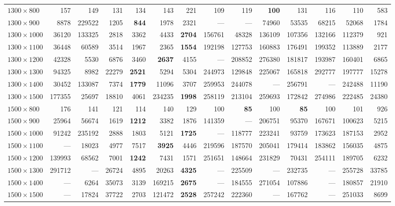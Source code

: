 \begin{table}[t!]
{\begin{tabular}{l r r r r r r r r r r r r r}
		$1300 \times 800$ & 157 & 149 & 131 & 134 & 143 & 221
		& 109 & 119 & \textbf{100} & 131 & 116 & 110 & 583 \\
		$1300 \times 900$ & 8878 & 229522 & 1205 & \textbf{844} & 1978 & 2321
		& --- & --- & 74960 & 53535 & 68215 & 52068 & 1784 \\
		$1300 \times 1000$ & 36120 & 133325 & 2818 & 3362 & 4433 & \textbf{2704}
		& 156761 & 48328 & 136109 & 107356 & 132166 & 112379 & 921 \\
		$1300 \times 1100$ & 36448 & 60589 & 3514 & 1967 & 2365 & \textbf{1554}
		& 192198 & 127753 & 160883 & 176491 & 199352 & 113889 & 2177 \\
		$1300 \times 1200$ & 42328 & 5530 & 6876 & 3460 & \textbf{2637} & 4155
		& --- & 208852 & 276380 & 181817 & 193987 & 160401 & 6865 \\
		$1300 \times 1300$ & 94325 & 8982 & 22279 & \textbf{2521} & 5294 & 5304
		& 244973 & 129848 & 225067 & 165818 & 292777 & 197777 & 15278 \\	
		$1300 \times 1400$ & 30452 & 133087 & 7374 & \textbf{1779} & 11096 & 3707
		& 259953 & 244078 & --- & 256791 & --- & 242488 & 11190 \\
		$1300 \times 1500$ & 177355 & 25697 & 18810 & 4061 & 234235 & \textbf{1998}
		& 258119 & 213104 & 259693 & 172842 & 274986 & 222485 & 24380 \\
		$1500 \times 800$ & 176 & 141 & 121 & 114 & 140 & 129
		& 100 & \textbf{85} & 100 & \textbf{85} & 100 & 101 & 926 \\ 
		$1500 \times 900$ & 25964 & 56674 & 1619 & \textbf{1212} & 3382 & 1876
		& 141359 & --- & 206751 & 95370 & 167671 & 100623 & 5215 \\ 
		$1500 \times 1000$ & 91242 & 235192 & 2888 & 1803 & 5121 & \textbf{1725}
		& --- & 118777 & 223241 & 93759 & 173623 & 187153 & 2952 \\
		$1500 \times 1100$ & --- & 18023 & 4977 & 7517 & \textbf{3925} & 4446
		& 219596 & 187570 & 205041 & 179414 & 183862 & 156035 & 4875 \\
		$1500 \times 1200$ & 139993 & 68562 & 7001 & \textbf{1242} & 7431 & 1571
		& 251651 & 148664 & 231829 & 70431 & 254111 & 189705 & 6232 \\
		$1500 \times 1300$ & 291712 & --- & 26724 & 4895 & 20263 & \textbf{4325}
		& --- & 225509 & --- & 232735 & --- & 255728 & 33785 \\
		$1500 \times 1400$ & --- & 6264 & 35073 & 3139 & 169215 & \textbf{2675}
		& --- & 184555 & 271054 & 107886 & --- & 180857 & 21910 \\
		$1500 \times 1500$ & --- & 17824 & 37722 & 2703 & 121472 & \textbf{2528}
		& 257242 & 222360 & --- & 167762 & --- & 251033 & 8699 \\
		\bottomrule
	\end{tabular}}
\end{table}
